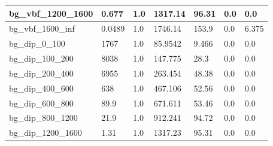 \documentclass[a4paper, 10pt]{article}
\begin{document}
\begin{table}[H]
\begin{center}
\begin{tabular}{|m{23.0mm}|m{23.0mm}|m{18.0mm}|m{19.0mm}|m{19.0mm}|m{19.0mm}|m{19.0mm}|}
      \hline
      {\cellcolor{white}         bg\_vbf\_1200\_1600}& {\cellcolor{white}         0.677}& {\cellcolor{white}         1.0}& {\cellcolor{white}         1317.14}& {\cellcolor{white}         96.31}& {\cellcolor{green}         0.0}& {\cellcolor{green}         0.0}\\
      \hline
      {\cellcolor{white}         bg\_vbf\_1600\_inf}& {\cellcolor{white}         0.0489}& {\cellcolor{white}         1.0}& {\cellcolor{white}         1746.14}& {\cellcolor{white}         153.9}& {\cellcolor{orange}         0.0}& {\cellcolor{orange}         6.375}\\
      \hline
      {\cellcolor{white}         bg\_dip\_0\_100}& {\cellcolor{white}         1767}& {\cellcolor{white}         1.0}& {\cellcolor{white}         85.9542}& {\cellcolor{white}         9.466}& {\cellcolor{green}         0.0}& {\cellcolor{green}         0.0}\\
      \hline
      {\cellcolor{white}         bg\_dip\_100\_200}& {\cellcolor{white}         8038}& {\cellcolor{white}         1.0}& {\cellcolor{white}         147.775}& {\cellcolor{white}         28.3}& {\cellcolor{green}         0.0}& {\cellcolor{green}         0.0}\\
      \hline
      {\cellcolor{white}         bg\_dip\_200\_400}& {\cellcolor{white}         6955}& {\cellcolor{white}         1.0}& {\cellcolor{white}         263.454}& {\cellcolor{white}         48.38}& {\cellcolor{green}         0.0}& {\cellcolor{green}         0.0}\\
      \hline
      {\cellcolor{white}         bg\_dip\_400\_600}& {\cellcolor{white}         638}& {\cellcolor{white}         1.0}& {\cellcolor{white}         467.106}& {\cellcolor{white}         52.56}& {\cellcolor{green}         0.0}& {\cellcolor{green}         0.0}\\
      \hline
      {\cellcolor{white}         bg\_dip\_600\_800}& {\cellcolor{white}         89.9}& {\cellcolor{white}         1.0}& {\cellcolor{white}         671.611}& {\cellcolor{white}         53.46}& {\cellcolor{green}         0.0}& {\cellcolor{green}         0.0}\\
      \hline
      {\cellcolor{white}         bg\_dip\_800\_1200}& {\cellcolor{white}         21.9}& {\cellcolor{white}         1.0}& {\cellcolor{white}         912.241}& {\cellcolor{white}         94.72}& {\cellcolor{green}         0.0}& {\cellcolor{green}         0.0}\\
      \hline
      {\cellcolor{white}         bg\_dip\_1200\_1600}& {\cellcolor{white}         1.31}& {\cellcolor{white}         1.0}& {\cellcolor{white}         1317.23}& {\cellcolor{white}         95.31}& {\cellcolor{green}         0.0}& {\cellcolor{green}         0.0}\\

\end{tabular}
\end{center}
\end{table}
\end{document}
